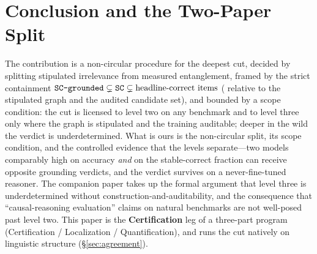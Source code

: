 \section{Conclusion and the Two-Paper Split}
The contribution is a non-circular procedure for the deepest cut, decided by
splitting stipulated irrelevance from measured entanglement, framed by the
strict containment $\texttt{SC-grounded}{} \subsetneq \texttt{SC}{} \subsetneq \text{headline-correct
items}$ (\scg{} relative to the stipulated graph and the audited
candidate set), and bounded by a scope condition: the cut is licensed to
level two on any benchmark and to level three only where the graph is
stipulated and the training auditable; deeper in the wild the verdict is
underdetermined. What is ours is the non-circular split, its scope
condition, and the controlled evidence that the levels separate---two
models comparably high on accuracy \emph{and} on the stable-correct
fraction can receive opposite grounding verdicts, and the verdict survives
on a never-fine-tuned reasoner.
The companion paper takes up the formal argument that level three is
underdetermined without construction-and-auditability, and the consequence that
``causal-reasoning evaluation'' claims on natural benchmarks are not well-posed
past level two. This paper is the \textbf{Certification} leg of a three-part
program (Certification / Localization / Quantification), and runs the cut
natively on linguistic structure (\S\ref{sec:agreement}).





